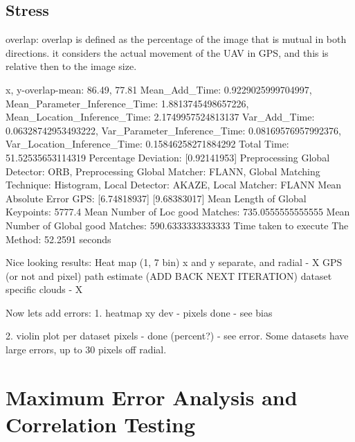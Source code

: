 \subsection*{Stress}

overlap: overlap is defined as the percentage of the image that is mutual in both directions. it considers the actual movement of the UAV in GPS, and this is relative then to the image size. 



x, y-overlap-mean: 86.49, 77.81
Mean_Add_Time: 0.9229025999704997, Mean_Parameter_Inference_Time: 1.8813745498657226, Mean_Location_Inference_Time: 2.1749957524813137
Var_Add_Time: 0.06328742953493222, Var_Parameter_Inference_Time: 0.08169576957992376, Var_Location_Inference_Time: 0.15846258271884292
Total Time: 51.52535653114319
Percentage Deviation: [0.92141953] %
Preprocessing Global Detector: ORB, Preprocessing Global Matcher: FLANN, Global Matching Technique: Histogram, Local Detector: AKAZE, Local Matcher: FLANN
Mean Absolute Error GPS: [6.74818937]
[9.68383017]
Mean Length of Global Keypoints: 5777.4
Mean Number of Loc good Matches: 735.0555555555555
Mean Number of Global good Matches: 590.6333333333333
Time taken to execute The Method: 52.2591 seconds





Nice looking results:
Heat map (1, 7 bin) x and y separate, and radial - X 
GPS (or not and pixel) path estimate (ADD BACK NEXT ITERATION)
dataset specific clouds - X


Now lets add errors:
1. heatmap xy dev - pixels done - see bias


2. violin plot per dataset pixels - done (percent?) - see error. Some datasets have large errors, up to 30 pixels off radial.


\section{Maximum Error Analysis and Correlation Testing}




